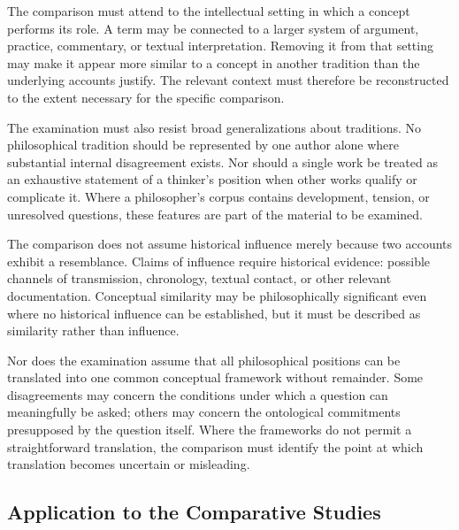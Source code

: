 \label{para:VS.B01.P01.C08.S01.SS08.P002}
The comparison must attend to the intellectual setting
in which a concept performs its role. A term may be
connected to a larger system of argument, practice,
commentary, or textual interpretation. Removing it
from that setting may make it appear more similar to
a concept in another tradition than the underlying
accounts justify. The relevant context must therefore
be reconstructed to the extent necessary for the
specific comparison.

\label{para:VS.B01.P01.C08.S01.SS08.P003}
The examination must also resist broad generalizations
about traditions. No philosophical tradition should
be represented by one author alone where substantial
internal disagreement exists. Nor should a single
work be treated as an exhaustive statement of a
thinker's position when other works qualify or
complicate it. Where a philosopher's corpus contains
development, tension, or unresolved questions, these
features are part of the material to be examined.

\label{para:VS.B01.P01.C08.S01.SS08.P004}
The comparison does not assume historical influence
merely because two accounts exhibit a resemblance.
Claims of influence require historical evidence:
possible channels of transmission, chronology,
textual contact, or other relevant documentation.
Conceptual similarity may be philosophically
significant even where no historical influence can
be established, but it must be described as
similarity rather than influence.

\label{para:VS.B01.P01.C08.S01.SS08.P005}
Nor does the examination assume that all philosophical
positions can be translated into one common conceptual
framework without remainder. Some disagreements may
concern the conditions under which a question can
meaningfully be asked; others may concern the
ontological commitments presupposed by the question
itself. Where the frameworks do not permit a
straightforward translation, the comparison must
identify the point at which translation becomes
uncertain or misleading.

\subsection{Application to the Comparative Studies}
\label{sec:ch08-s01-ss09}

